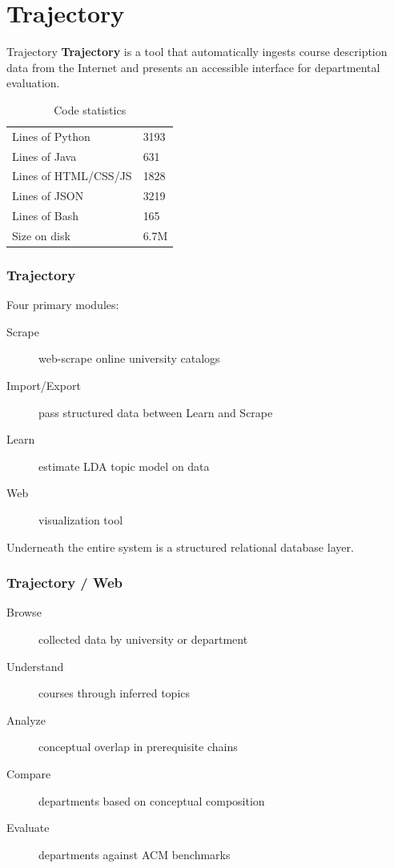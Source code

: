 \documentclass[10pt, compress]{beamer}
\begin{document}
\section{Trajectory}


\begin{frame}{Trajectory}
  \textbf{Trajectory} is a tool that automatically ingests course
  description data from the Internet and presents an accessible interface
  for departmental evaluation.

  \begin{table}
    \begin{tabular}{ll}
      \toprule
      Lines of Python & 3193 \\
      Lines of Java & 631 \\
      Lines of HTML/CSS/JS & 1828 \\
      Lines of JSON & 3219 \\
      Lines of Bash & 165 \\
      \midrule
      Size on disk & 6.7M \\
      \bottomrule
    \end{tabular}
    \caption{Code statistics}
  \end{table}

\end{frame}


\begin{frame}
  \frametitle{Trajectory}
  Four primary modules:

  \begin{description}
    \item[Scrape] web-scrape online university catalogs
    \item[Import/Export] pass structured data between Learn and Scrape
    \item[Learn] estimate LDA topic model on data
    \item[Web] visualization tool
  \end{description}

  Underneath the entire system is a structured relational database layer.
\end{frame}


\begin{frame}
  \frametitle{Trajectory / Web}
  \begin{description}
    \item[Browse] collected data by university or department
    \item[Understand] courses through inferred topics
    \item[Analyze] conceptual overlap in prerequisite chains
    \item[Compare] departments based on conceptual composition
    \item[Evaluate] departments against ACM benchmarks
  \end{description}
\end{frame}
\end{document}
